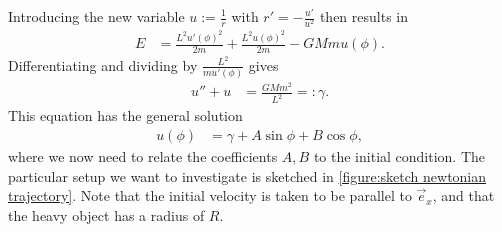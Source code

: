 \documentclass[english, parskip=full]{scrartcl}
\begin{document}
Introducing the new variable $u := \frac{1}{r}$ with $r' = -\frac{u'}{u^2}$ then results in
\begin{align}
E &= \frac{L^2u'(\phi)^2}{2m} + \frac{L^2 u(\phi)^2}{2m} - GMm u(\phi).
\end{align}
Differentiating and dividing by $\frac{L^2}{m u'(\phi)}$ gives
\begin{align}
u'' + u &= \frac{GMm^2}{L^2} =: \gamma. \label{eqn:newtonian trajectory general solution}
\end{align}
This equation has the general solution
\begin{align}
u(\phi) &= \gamma + A\sin\phi + B\cos\phi,
\end{align}
where we now need to relate the coefficients $A,B$ to the initial condition.
The particular setup we want to investigate is sketched in \autoref{figure:sketch newtonian trajectory}.
Note that the initial velocity is taken to be parallel to $\vec{e}_x$, and that the heavy object has a radius of $R$.
\end{document}
